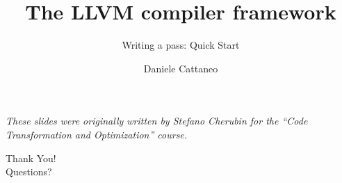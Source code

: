 

\author{Daniele Cattaneo}
\date{\DATE}
\title{The LLVM compiler framework}
\subtitle{Writing a pass: Quick Start}
\newcommand{\customdata}{Daniele Cattaneo <stefano.cherubin@polimi.it>}






\begin{frame}
\maketitle
\begin{center}
\itshape\scriptsize
These slides were originally written by
Stefano Cherubin for the
``Code Transformation and Optimization'' course.
\end{center}
\end{frame}






\begin{frame}[plain]{}
\Huge\centering
Thank You!\\
\bigskip
\normalsize
Questions?
\end{frame}



